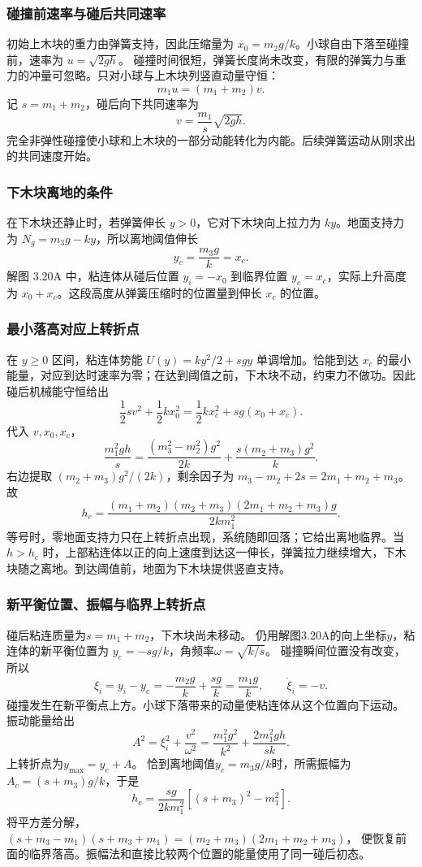 \documentclass[UTF8,fontset=fandol,a4paper,11pt]{ctexart}
\begin{document}
\subsubsection*{碰撞前速率与碰后共同速率}
初始上木块的重力由弹簧支持，因此压缩量为
$x_0=m_2g/k$。小球自由下落至碰撞前，速率为 $u=\sqrt{2gh}$。
碰撞时间很短，弹簧长度尚未改变，有限的弹簧力与重力的冲量可忽略。只对小球与上木块列竖直动量守恒：
\[
m_1u=(m_1+m_2)v.
\]
记 $s=m_1+m_2$，碰后向下共同速率为
\[
v=\frac{m_1}{s}\sqrt{2gh}.
\]
完全非弹性碰撞使小球和上木块的一部分动能转化为内能。后续弹簧运动从刚求出的共同速度开始。

\subsubsection*{下木块离地的条件}
在下木块还静止时，若弹簧伸长 $y>0$，它对下木块向上拉力为 $ky$。地面支持力为 $N_g=m_3g-ky$，所以离地阈值伸长
\[
y_c=\frac{m_3g}{k}=x_c.
\]
解图 3.20A 中，粘连体从碰后位置 $y_i=-x_0$ 到临界位置 $y_c=x_c$，实际上升高度为 $x_0+x_c$。这段高度从弹簧压缩时的位置量到伸长 $x_c$ 的位置。

\subsubsection*{最小落高对应上转折点}
在 $y\geq0$ 区间，粘连体势能
$U(y)=ky^2/2+sgy$ 单调增加。恰能到达 $x_c$ 的最小能量，对应到达时速率为零；在达到阈值之前，下木块不动，约束力不做功。因此碰后机械能守恒给出
\[
\frac12sv^2+\frac12kx_0^2
=\frac12kx_c^2+sg(x_0+x_c).
\]
代入 $v,x_0,x_c$，
\[
\frac{m_1^2gh}{s}
=\frac{(m_3^2-m_2^2)g^2}{2k}
+\frac{s(m_2+m_3)g^2}{k}.
\]
右边提取 $(m_2+m_3)g^2/(2k)$，剩余因子为
$m_3-m_2+2s=2m_1+m_2+m_3$。故
\[
\boxed{h_c=
\frac{(m_1+m_2)(m_2+m_3)(2m_1+m_2+m_3)g}
{2km_1^2}}.
\]
等号时，零地面支持力只在上转折点出现，系统随即回落；它给出离地临界。当 $h>h_c$ 时，上部粘连体以正的向上速度到达这一伸长，弹簧拉力继续增大，下木块随之离地。到达阈值前，地面为下木块提供竖直支持。
\subsubsection*{新平衡位置、振幅与临界上转折点}
碰后粘连质量为$s=m_1+m_2$，下木块尚未移动。
仍用解图3.20A的向上坐标$y$，粘连体的新平衡位置为
$y_e=-sg/k$，角频率$\omega=\sqrt{k/s}$。
碰撞瞬间位置没有改变，所以
\[
\xi_i=y_i-y_e=-\frac{m_2g}{k}+\frac{sg}{k}
=\frac{m_1g}{k},\qquad \dot\xi_i=-v.
\]
碰撞发生在新平衡点上方。小球下落带来的动量使粘连体从这个位置向下运动。
振动能量给出
\[
A^2=\xi_i^2+\frac{v^2}{\omega^2}
=\frac{m_1^2g^2}{k^2}+\frac{2m_1^2gh}{sk}.
\]
上转折点为$y_{\max}=y_e+A$。
恰到离地阈值$y_c=m_3g/k$时，所需振幅为
$A_c=(s+m_3)g/k$，于是
\[
h_c=\frac{sg}{2km_1^2}[(s+m_3)^2-m_1^2].
\]
将平方差分解，
$(s+m_3-m_1)(s+m_3+m_1)
=(m_2+m_3)(2m_1+m_2+m_3)$，
便恢复前面的临界落高。振幅法和直接比较两个位置的能量使用了同一碰后初态。
\end{document}
